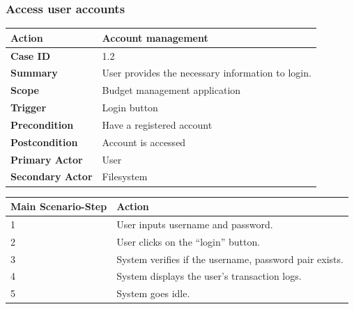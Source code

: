 \documentclass[letterpaper]{article}
\begin{document}
        \subsubsection{Access user accounts}
		
        \begin{center}
	        \begin{tabular}{ | m{3.5cm} | m{7.5cm}| } 
	            \hline
	            \textbf{Action} & Account management \\ 
	            \hline
	            \textbf{Case ID} & 1.2 \\ 
	            \hline
	            \textbf{Summary} & User provides the necessary information to login. \\
	            \hline
	            \textbf{Scope} & Budget management application \\ 
	            \hline
	            \textbf{Trigger} & Login button \\
	            \hline
	            \textbf{Precondition} & Have a registered account \\ 
	            \hline
	            \textbf{Postcondition} & Account is accessed \\ 
	            \hline
	            \textbf{Primary Actor} & User \\ 
	            \hline
	            \textbf{Secondary Actor} & Filesystem \\ 
	            \hline
	        \end{tabular}
        
        	\vspace{2mm}
        
			\begin{tabular}{ | m{3.5cm} | m{7.5cm}| } 
				\hline
	            \textbf{Main Scenario-Step} & \textbf{Action} \\ 
	            \hline
	            1 & User inputs username and password. \\ 
	            \hline
	            2 & User clicks on the “login” button. \\ 
	            \hline
	            3 & System verifies if the username, password pair exists. \\ 
	            \hline
	            4 & System displays the user's transaction logs. \\ 
	            \hline
	            5 & System goes idle. \\ 
	            \hline
	        \end{tabular}
        \end{center}
\end{document}
